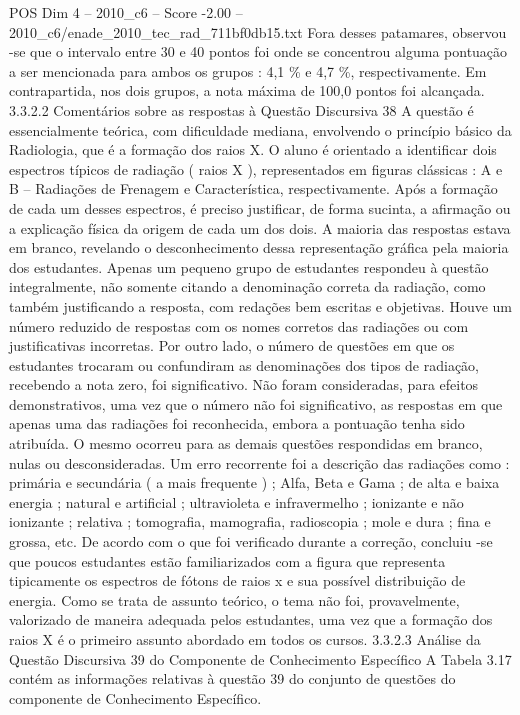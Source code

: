 \begin{textsample}{POS Dim 4 – 2010\_c6 – Score -2.00 – 2010\_c6/enade\_2010\_tec\_rad\_711bf0db15.txt}
Fora desses patamares, observou -se que o intervalo entre 30 e 40 pontos foi onde se concentrou alguma pontuação a ser mencionada para ambos os grupos : 4,1 \% e 4,7 \%, respectivamente.
Em contrapartida, nos dois grupos, a nota máxima de 100,0 pontos foi alcançada. 3.3.2.2 Comentários sobre as respostas à Questão Discursiva 38 A questão é essencialmente teórica, com dificuldade mediana, envolvendo o princípio básico da Radiologia, que é a formação dos raios X.
O aluno é orientado a identificar dois espectros típicos de radiação ( raios X ), representados em figuras clássicas : A e B – Radiações de Frenagem e Característica, respectivamente.
Após a formação de cada um desses espectros, é preciso justificar, de forma sucinta, a afirmação ou a explicação física da origem de cada um dos dois.
A maioria das respostas estava em branco, revelando o desconhecimento dessa representação gráfica pela maioria dos estudantes.
Apenas um pequeno grupo de estudantes respondeu à questão integralmente, não somente citando a denominação correta da radiação, como também justificando a resposta, com redações bem escritas e objetivas.
Houve um número reduzido de respostas com os nomes corretos das radiações ou com justificativas incorretas.
Por outro lado, o número de questões em que os estudantes trocaram ou confundiram as denominações dos tipos de radiação, recebendo a nota zero, foi significativo.
Não foram consideradas, para efeitos demonstrativos, uma vez que o número não foi significativo, as respostas em que apenas uma das radiações foi reconhecida, embora a pontuação tenha sido atribuída.
O mesmo ocorreu para as demais questões respondidas em branco, nulas ou desconsideradas.
Um erro recorrente foi a descrição das radiações como : primária e secundária ( a mais frequente ) ; Alfa, Beta e Gama ; de alta e baixa energia ; natural e artificial ; ultravioleta e infravermelho ; ionizante e não ionizante ; relativa ; tomografia, mamografia, radioscopia ; mole e dura ; fina e grossa, etc.
De acordo com o que foi verificado durante a correção, concluiu -se que poucos estudantes estão familiarizados com a figura que representa tipicamente os espectros de fótons de raios x e sua possível distribuição de energia.
Como se trata de assunto teórico, o tema não foi, provavelmente, valorizado de maneira adequada pelos estudantes, uma vez que a formação dos raios X é o primeiro assunto abordado em todos os cursos. 3.3.2.3 Análise da Questão Discursiva 39 do Componente de Conhecimento Específico A Tabela 3.17 contém as informações relativas à questão 39 do conjunto de questões do componente de Conhecimento Específico.

\end{textsample}
